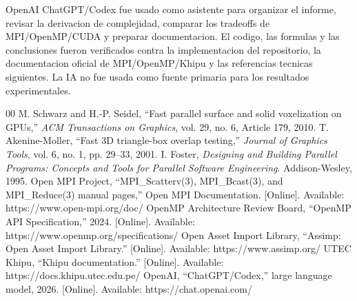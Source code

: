 \documentclass[conference]{IEEEtran}
\begin{document}
OpenAI ChatGPT/Codex fue usado como asistente para organizar el informe, revisar
la derivacion de complejidad, comparar los tradeoffs de MPI/OpenMP/CUDA y
preparar documentacion. El codigo, las formulas y las conclusiones fueron
verificados contra la implementacion del repositorio, la documentacion oficial
de MPI/OpenMP/Khipu y las referencias tecnicas siguientes. La IA no fue usada
como fuente primaria para los resultados experimentales.

\begin{thebibliography}{00}
     M. Schwarz and H.-P. Seidel, ``Fast parallel surface and solid voxelization on GPUs,'' \textit{ACM Transactions on Graphics}, vol. 29, no. 6, Article 179, 2010.
     T. Akenine-Moller, ``Fast 3D triangle-box overlap testing,'' \textit{Journal of Graphics Tools}, vol. 6, no. 1, pp. 29--33, 2001.
     I. Foster, \textit{Designing and Building Parallel Programs: Concepts and Tools for Parallel Software Engineering}. Addison-Wesley, 1995.
     Open MPI Project, ``MPI\_Scatterv(3), MPI\_Bcast(3), and MPI\_Reduce(3) manual pages,'' Open MPI Documentation. [Online]. Available: https://www.open-mpi.org/doc/
     OpenMP Architecture Review Board, ``OpenMP API Specification,'' 2024. [Online]. Available: https://www.openmp.org/specifications/
     Open Asset Import Library, ``Assimp: Open Asset Import Library.'' [Online]. Available: https://www.assimp.org/
     UTEC Khipu, ``Khipu documentation.'' [Online]. Available: https://docs.khipu.utec.edu.pe/
     OpenAI, ``ChatGPT/Codex,'' large language model, 2026. [Online]. Available: https://chat.openai.com/
\end{thebibliography}
\end{document}
